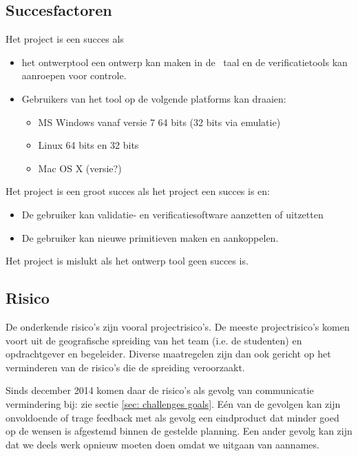 \subsection{Succesfactoren}
Het project is een succes als

\begin{itemize}
 \item het ontwerptool een ontwerp kan maken in de \xmas\ taal en de verificatietools kan aanroepen voor controle.
 \item Gebruikers van het tool op de volgende platforms kan draaien:
 \begin{itemize}
    \item MS Windows vanaf versie 7 64 bits (32 bits via emulatie)
    \item Linux 64 bits en 32 bits
    \item Mac OS X (versie?)
 \end{itemize}
\end{itemize}

Het project is een groot succes als het project een succes is en:

\begin{itemize}
 \item De gebruiker kan validatie- en verificatiesoftware aanzetten of uitzetten
 \item De gebruiker kan nieuwe primitieven maken en aankoppelen.
\end{itemize}

Het project is mislukt als het ontwerp tool geen succes is.

\subsection{Risico}

De onderkende risico's zijn vooral projectrisico's. De meeste projectrisico's komen voort uit de
geografische spreiding van het team (i.e. de studenten) en opdrachtgever
en begeleider. Diverse maatregelen zijn dan ook gericht op het verminderen
van de risico's die de spreiding veroorzaakt. 

\begin{aanpassing1}
Sinds december 2014 komen daar de risico's als gevolg van communicatie 
vermindering bij: zie sectie \ref{sec: challenges goals}. E\'{e}n van de 
gevolgen kan zijn onvoldoende of trage feedback met als gevolg een eindproduct 
dat minder goed op de wensen is afgestemd binnen de gestelde planning. Een ander 
gevolg kan zijn dat we deels werk opnieuw moeten doen omdat we uitgaan van aannames. 
\end{aanpassing1}

